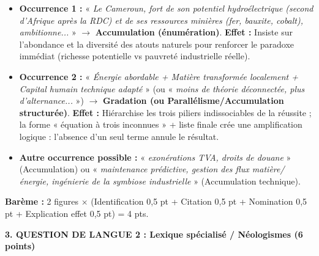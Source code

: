 \documentclass[11pt]{article}
\begin{document}
\begin{exoresolu}
\begin{itemize}
\item \textbf{Occurrence 1 :} « \emph{Le Cameroun, fort de son potentiel hydroélectrique (second d'Afrique après la RDC) et de ses ressources minières (fer, bauxite, cobalt), ambitionne...} » $\to$ \textbf{Accumulation (énumération)}. \textbf{Effet :} Insiste sur l'abondance et la diversité des atouts naturels pour renforcer le paradoxe immédiat (richesse potentielle vs pauvreté industrielle réelle).
\item \textbf{Occurrence 2 :} « \emph{Énergie abordable + Matière transformée localement + Capital humain technique adapté} » (ou « \emph{moins de théorie déconnectée, plus d'alternance...} ») $\to$ \textbf{Gradation (ou Parallélisme/Accumulation structurée)}. \textbf{Effet :} Hiérarchise les trois piliers indissociables de la réussite ; la forme « équation à trois inconnues » + liste finale crée une amplification logique : l'absence d'un seul terme annule le résultat.
\item \textbf{Autre occurrence possible :} « \emph{exonérations TVA, droits de douane} » (Accumulation) ou « \emph{maintenance prédictive, gestion des flux matière/énergie, ingénierie de la symbiose industrielle} » (Accumulation technique).
\end{itemize}
\textbf{Barème :} 2 figures $\times$ (Identification 0,5 pt + Citation 0,5 pt + Nomination 0,5 pt + Explication effet 0,5 pt) = 4 pts.

\textbf{3. QUESTION DE LANGUE 2 : Lexique spécialisé / Néologismes (6 points)}


\end{exoresolu}
\end{document}
